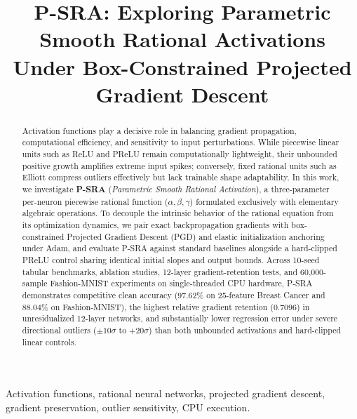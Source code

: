 \documentclass[conference]{IEEEtran}
\begin{document}
\title{P-SRA: Exploring Parametric Smooth Rational Activations Under Box-Constrained Projected Gradient Descent}

\author{
}

\maketitle

\begin{abstract}
Activation functions play a decisive role in balancing gradient propagation, computational efficiency, and sensitivity to input perturbations. While piecewise linear units such as ReLU and PReLU remain computationally lightweight, their unbounded positive growth amplifies extreme input spikes; conversely, fixed rational units such as Elliott compress outliers effectively but lack trainable shape adaptability. In this work, we investigate \textbf{P-SRA} (\textit{Parametric Smooth Rational Activation}), a three-parameter per-neuron piecewise rational function ($\alpha, \beta, \gamma$) formulated exclusively with elementary algebraic operations. To decouple the intrinsic behavior of the rational equation from its optimization dynamics, we pair exact backpropagation gradients with box-constrained Projected Gradient Descent (PGD) and elastic initialization anchoring under Adam, and evaluate P-SRA against standard baselines alongside a hard-clipped PReLU control sharing identical initial slopes and output bounds. Across 10-seed tabular benchmarks, ablation studies, 12-layer gradient-retention tests, and 60,000-sample Fashion-MNIST experiments on single-threaded CPU hardware, P-SRA demonstrates competitive clean accuracy (97.62\% on 25-feature Breast Cancer and 88.04\% on Fashion-MNIST), the highest relative gradient retention (0.7096) in unresidualized 12-layer networks, and substantially lower regression error under severe directional outliers ($\pm 10\sigma$ to $+20\sigma$) than both unbounded activations and hard-clipped linear controls.
\end{abstract}

\begin{IEEEkeywords}
Activation functions, rational neural networks, projected gradient descent, gradient preservation, outlier sensitivity, CPU execution.
\end{IEEEkeywords}
\end{document}
